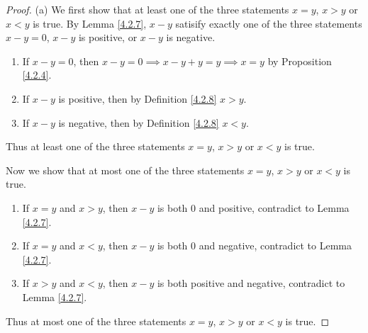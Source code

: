 \begin{proof}{(a)}
We first show that at least one of the three statements \(x = y\), \(x > y\) or \(x < y\) is true.
By Lemma \ref{4.2.7}, \(x - y\) satisify exactly one of the three statements \(x - y = 0\), \(x - y\) is positive, or \(x - y\) is negative.
\begin{enumerate}[label=(\roman*)]
    \item If \(x - y = 0\), then \(x - y = 0 \implies x - y + y = y \implies x = y\) by Proposition \ref{4.2.4}.
    \item If \(x - y\) is positive, then by Definition \ref{4.2.8} \(x > y\).
    \item If \(x - y\) is negative, then by Definition \ref{4.2.8} \(x < y\).
\end{enumerate}
Thus at least one of the three statements \(x = y\), \(x > y\) or \(x < y\) is true.

Now we show that at most one of the three statements \(x = y\), \(x > y\) or \(x < y\) is true.
\begin{enumerate}[label=(\roman*)]
    \item If \(x = y\) and \(x > y\), then \(x - y\) is both \(0\) and positive, contradict to Lemma \ref{4.2.7}.
    \item If \(x = y\) and \(x < y\), then \(x - y\) is both \(0\) and negative, contradict to Lemma \ref{4.2.7}.
    \item If \(x > y\) and \(x < y\), then \(x - y\) is both positive and negative, contradict to Lemma \ref{4.2.7}.
\end{enumerate}
Thus at most one of the three statements \(x = y\), \(x > y\) or \(x < y\) is true.
\end{proof}

